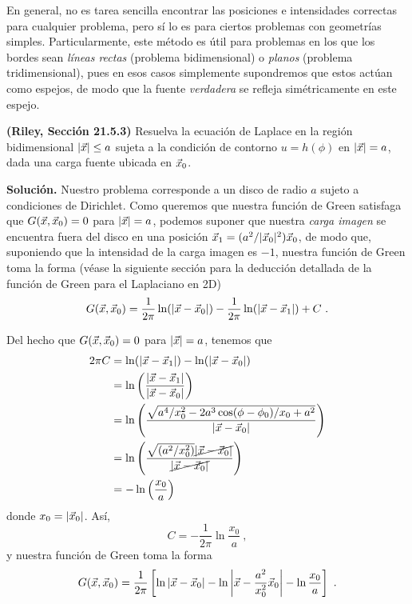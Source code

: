 En general, no es tarea sencilla encontrar las posiciones e intensidades correctas para cualquier problema, pero sí lo es para ciertos problemas con geometrías simples. Particularmente, este método es útil para problemas en los que los bordes sean \emph{líneas rectas} (problema bidimensional) o \emph{planos} (problema tridimensional), pues en esos casos simplemente supondremos que estos actúan como espejos, de modo que la fuente \emph{verdadera} se refleja simétricamente en este espejo.

\begin{ejemplo}
    \textbf{(Riley, Sección 21.5.3)} Resuelva la ecuación de Laplace en la región bidimensional $|\vec{x}| \leq a$ sujeta a la condición de contorno $u = h(\phi)$ en $|\vec{x}| = a$, dada una carga fuente ubicada en $\vec{x}_0$.

    \textbf{Solución.} Nuestro problema corresponde a un disco de radio $a$ sujeto a condiciones de Dirichlet. Como queremos que nuestra función de Green satisfaga que $G(\vec{x}, \vec{x}_0) = 0$ para $|\vec{x}| = a$, podemos suponer que nuestra \emph{carga imagen} se encuentra fuera del disco en una posición $\vec{x}_1 = (a^2/|\vec{x}_0|^2)\vec{x}_0$, de modo que, suponiendo que la intensidad de la carga imagen es $-1$, nuestra función de Green toma la forma (véase la siguiente sección para la deducción detallada de la función de Green para el Laplaciano en 2D)
    \begin{equation*}
        G(\vec{x}, \vec{x}_0) = \frac{1}{2\pi} \ln(|\vec{x} - \vec{x}_0|) - \frac{1}{2\pi} \ln(|\vec{x} - \vec{x}_1|) + C \ .
    \end{equation*}

    Del hecho que $G(\vec{x}, \vec{x}_0) = 0$ para $|\vec{x}| = a$, tenemos que
    \begin{align*}
        2\pi C & = \ln(|\vec{x} - \vec{x}_1|) - \ln(|\vec{x} - \vec{x}_0|) \\
        & = \ln\left( \frac{|\vec{x} - \vec{x}_1|}{|\vec{x} - \vec{x}_0|} \right) \\
        & = \ln \left( \frac{\sqrt{a^4/x_0^2 - 2 a^3 \cos(\phi - \phi_0)/x_0 + a^2}}{|\vec{x} - \vec{x}_0|} \right) \\
        & = \ln \left( \frac{\sqrt{(a^2/x_0^2)}\cancel{|\vec{x} - \vec{x}_0|}}{\cancel{|\vec{x} - \vec{x}_0|}} \right) \\
        & = - \ln \left( \frac{x_0}{a} \right)
    \end{align*}
    donde $x_0 = |\vec{x}_0|$. Así,
    \begin{equation*}
        C = - \frac{1}{2\pi} \ln \frac{x_0}{a} \ ,
    \end{equation*}
    y nuestra función de Green toma la forma 
    \begin{equation*}
        G(\vec{x}, \vec{x}_0) = \frac{1}{2\pi} \left[ \ln|\vec{x} - \vec{x}_0| - \ln\left| \vec{x} - \frac{a^2}{x_0^2} \vec{x}_0 \right| - \ln \frac{x_0}{a} \right] \ .
    \end{equation*}


\end{ejemplo}
